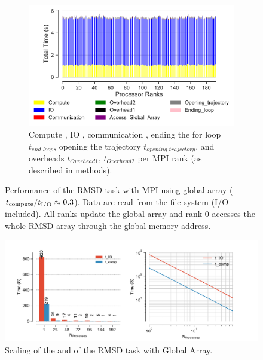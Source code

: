 \begin{figure}
\begin{subfigure} {.8\textwidth}
  \includegraphics[width=\linewidth]{figures/split-ga-BarPlot-rank-comparison_192_5.pdf}
  \caption{Compute \tcomp, IO \tIO, communication \tcomm , ending the for loop $t_{end\_loop}$,
  opening the trajectory $t_{opening\_trajectory}$, and overheads $t_{Overhead1}$,  $t_{Overhead2}$ per MPI rank (as described in methods).}
  \label{fig:MPIranks-split-ga}
\end{subfigure}
%
\caption{Performance of the RMSD task with MPI using global array (${t}_{\text{compute}}/{t}_{\text{I/O}} \approx 0.3$).
Data are read from the file system (I/O included). All ranks update the global array and rank 0 accesses the whole RMSD array through the global memory address.}
\label{fig:MPIwithIO-split-ga}
\end{figure}

\begin{figure}
\centering
  \includegraphics[width=\linewidth]{figures/split-ga-time_IO_comparison.pdf}
\caption{Scaling of the \tcomp and \tIO of the RMSD task with Global Array.}
\label{fig:ScalingComputeIO-split-ga}
\end{figure}

